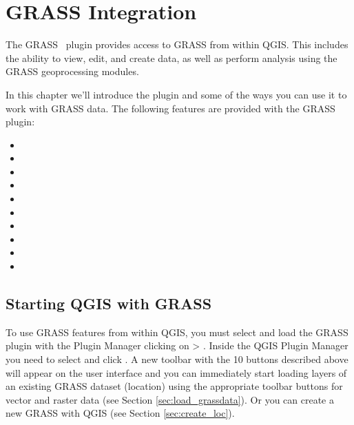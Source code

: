 \section{GRASS Integration}\label{sec:grass}

\updatedisclaimer

The GRASS~\cite{GRASSweb} plugin provides access to GRASS from within QGIS. 
This includes the ability to view, edit, and create data, as well as perform 
analysis using the GRASS geoprocessing modules.

In this chapter we'll introduce the plugin and some of the ways you can use 
it to work with GRASS data. The following features are provided with the GRASS 
plugin:
 
\begin{itemize}
\item {}
\item {}
\item {}
\item {}
\item {}
\item {}
\item {}
\item {}
\item {} 
\item {}
\end{itemize}

\subsection{Starting QGIS with GRASS}\label{sec:starting_grass}

To use GRASS features from within QGIS, you must select and load the GRASS
plugin with the Plugin Manager clicking on  >
. Inside the QGIS Plugin Manager you need to
select  and click . A new toolbar with the 10
buttons described above will appear on the user interface and you can
immediately start loading layers of an existing GRASS dataset (location)
using the appropriate toolbar buttons for vector and raster data (see Section
\ref{sec:load_grassdata}). Or you can create a new GRASS 
with QGIS (see Section \ref{sec:create_loc}).

